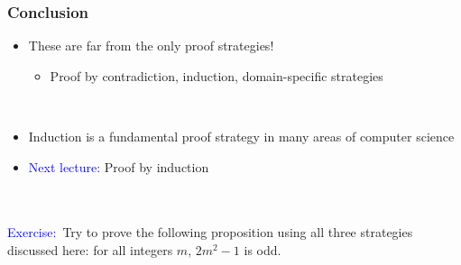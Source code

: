 \documentclass{beamer}
\newcommand{\exer}{\textcolor{blue}{Exercise:~}}
\begin{document}
\begin{frame}
  \frametitle{Conclusion}
  \begin{itemize}
  \item These are far from the only proof strategies!
    \begin{itemize}
    \item Proof by contradiction, induction, domain-specific
      strategies
    \end{itemize}
    \qquad\\
  \item Induction is a fundamental proof strategy in many areas of
    computer science\\
  \item \textcolor{blue}{Next lecture:} Proof by induction
  \end{itemize}
  \qquad\\\qquad\\
  
  \exer Try to prove the following proposition using all three
  strategies discussed here: for all integers $m$, $2m^2-1$ is odd.
\end{frame}
\end{document}
